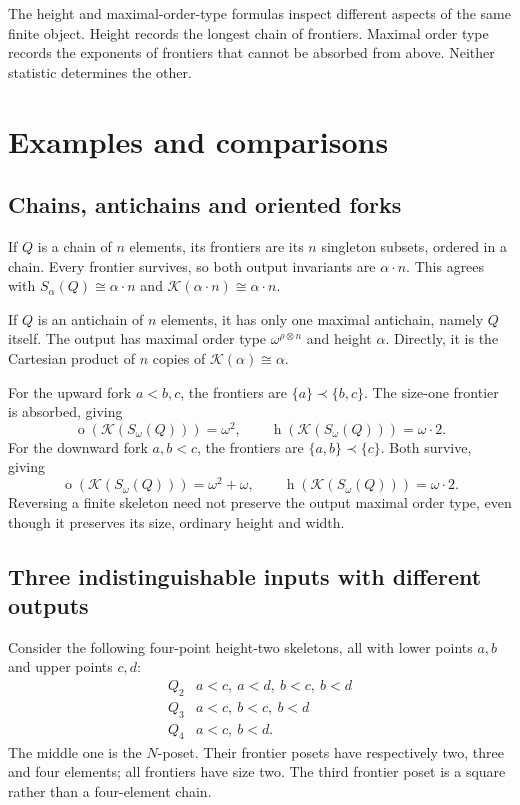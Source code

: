 \documentclass[11pt,a4paper]{article}
\theoremstyle{definition}
\theoremstyle{remark}
\newcommand{\K}{\mathcal K}
\newcommand{\ot}{\operatorname{o}}
\newcommand{\hgt}{\operatorname{h}}
\newcommand{\np}{\mathbin{\otimes}}
\begin{document}
The height and maximal-order-type formulas inspect different aspects of
the same finite object. Height records the longest chain of frontiers.
Maximal order type records the exponents of frontiers that cannot be
absorbed from above. Neither statistic determines the other.

\section{Examples and comparisons}\label{sec:examples}

\subsection{Chains, antichains and oriented forks}

If $Q$ is a chain of $n$ elements, its frontiers are its $n$ singleton
subsets, ordered in a chain. Every frontier survives, so both output
invariants are $\alpha\cdot n$. This agrees with
$S_\alpha(Q)\cong\alpha\cdot n$ and
$\K(\alpha\cdot n)\cong\alpha\cdot n$.

If $Q$ is an antichain of $n$ elements, it has only one maximal antichain,
namely $Q$ itself. The output has maximal order type
$\omega^{\rho\np n}$ and height $\alpha$. Directly, it is the Cartesian
product of $n$ copies of $\K(\alpha)\cong\alpha$.

For the upward fork $a<b,c$, the frontiers are
$\{a\}\prec\{b,c\}$. The size-one frontier is absorbed, giving
\[
 \ot(\K(S_\omega(Q)))=\omega^2,
 \qquad \hgt(\K(S_\omega(Q)))=\omega\cdot2.
\]
For the downward fork $a,b<c$, the frontiers are
$\{a,b\}\prec\{c\}$. Both survive, giving
\[
 \ot(\K(S_\omega(Q)))=\omega^2+\omega,
 \qquad \hgt(\K(S_\omega(Q)))=\omega\cdot2.
\]
Reversing a finite skeleton need not preserve the output maximal order
type, even though it preserves its size, ordinary height and width.

\subsection{Three indistinguishable inputs with different outputs}

Consider the following four-point height-two skeletons, all with lower
points $a,b$ and upper points $c,d$:
\[
\begin{array}{c|l}
 Q_2 & a<c,\ a<d,\ b<c,\ b<d \\[-1pt]
 Q_3 & a<c,\ b<c,\ b<d \\[-1pt]
 Q_4 & a<c,\ b<d.
\end{array}
\]
The middle one is the $N$-poset. Their frontier posets have respectively
two, three and four elements; all frontiers have size two. The third
frontier poset is a square rather than a four-element chain.
\end{document}
